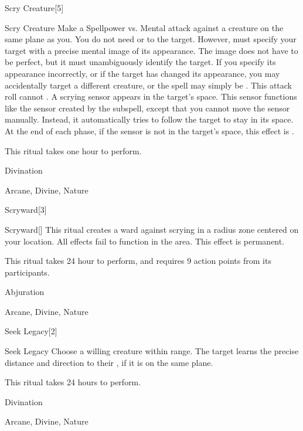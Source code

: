 \begin{spellsection}{Scry Creature}[5]


\begin{ability}{Scry Creature}
Make a Spellpower vs. Mental attack against a creature on the same plane as you.
You do not need  or  to the target.
However,  must specify your target with a precise mental image of its appearance.
The image does not have to be perfect, but it must unambiguously identify the target.
If you specify its appearance incorrectly, or if the target has changed its appearance, you may accidentally target a different creature, or the spell may simply be .
This attack roll cannot .
\hit A scrying sensor appears in the target's space.
This sensor functions like the sensor created by the  subspell, except that you cannot move the sensor manually.
Instead, it automatically tries to follow the target to stay in its space.
At the end of each phase, if the sensor is not in the target's space, this effect is .

This ritual takes one hour to perform.
\end{ability}




 Divination

 Arcane, Divine, Nature
\end{spellsection}


\begin{spellsection}{Scryward}[3]


\begin{ability}{Scryward}[]
This ritual creates a ward against scrying in a \arealarge radius zone centered on your location.
All  effects fail to function in the area.
This effect is permanent.

This ritual takes 24 hour to perform, and requires 9 action points from its participants.
\end{ability}




 Abjuration

 Arcane, Divine, Nature
\end{spellsection}


\begin{spellsection}{Seek Legacy}[2]


\begin{ability}{Seek Legacy}
Choose a willing creature within \rngclose range.
The target learns the precise distance and direction to their , if it is on the same plane.

This ritual takes 24 hours to perform.
\end{ability}




 Divination

 Arcane, Divine, Nature
\end{spellsection}


